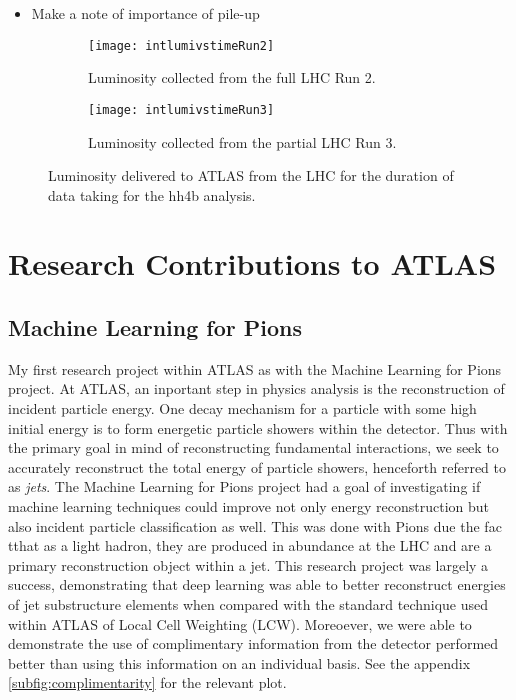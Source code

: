 \documentclass[12pt]{article}
\begin{document}
\begin{itemize}
    \item Make a note of importance of pile-up
\end{itemize}

\newpage
\begin{figure}[t!]
    \centering
    \begin{subfigure}[t]{.48\textwidth}
        \centering
        \texttt{[image: intlumivstimeRun2]}
        \caption{Luminosity collected from the full LHC Run 2.}
        \label{subfig:lumi_run2}
    \end{subfigure}
    \hfill
    \begin{subfigure}[t]{.48\textwidth}
        \centering
        \texttt{[image: intlumivstimeRun3]}
        \caption{Luminosity collected from the partial LHC Run 3.}
        \label{subfig:lumi_run3}
    \end{subfigure}
\caption{Luminosity delivered to ATLAS from the LHC for the duration of data taking for the hh4b analysis.}
\label{figure:lhc_luminosity}
\end{figure}

\section{Research Contributions to ATLAS}

\subsection{Machine Learning for Pions}
My first research project within ATLAS as with the Machine Learning for Pions
project. At ATLAS, an inportant step in physics analysis is the reconstruction
of incident particle energy. One decay mechanism for a particle with some high
initial energy is to form energetic particle showers within the detector. Thus
with the primary goal in mind of reconstructing fundamental interactions, we
seek to accurately reconstruct the total energy of particle showers, henceforth
referred to as \textit{jets}. The Machine Learning for Pions project had a goal
of investigating if machine learning techniques could improve not only energy
reconstruction but also incident particle classification as well. This was done
with Pions due the fac tthat as a light hadron, they are produced in abundance
at the LHC and are a primary reconstruction object within a jet. This research
project was largely a success, demonstrating that deep learning was able to
better reconstruct energies of jet substructure elements when compared with the
standard technique used within ATLAS of Local Cell Weighting (LCW). Moreoever,
we were able to demonstrate the use of complimentary information from the
detector performed better than using this information on an individual basis.
See the appendix \ref{subfig:complimentarity} for the relevant plot.
\end{document}
